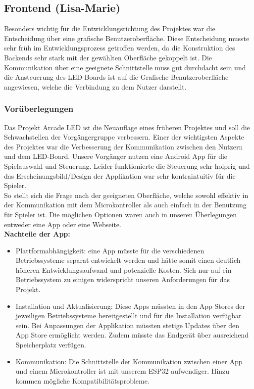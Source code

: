 \documentclass[12pt,a4paper]{article}
\begin{document}
\newpage

\subsection{Frontend  (Lisa-Marie)} 
Besonders wichtig für die Entwicklungsrichtung des Projektes war die Entscheidung über eine grafische Benutzeroberfläche. Diese Entscheidung musste sehr früh im Entwicklungsprozess getroffen werden, da die Konstruktion des Backends sehr stark mit der gewählten Oberfläche gekoppelt ist. Die Kommunikation über eine geeignete Schnittstelle muss gut durchdacht sein und die Ansteuerung des LED-Boards ist auf die Grafische Benutzeroberfläche angewiesen, welche die Verbindung zu dem Nutzer darstellt.  

\subsubsection{Vorüberlegungen}
Das Projekt Arcade LED ist die Neuauflage eines früheren Projektes und soll die Schwachstellen der Vorgängergruppe verbessern. Einer der wichtigsten Aspekte des Projektes war die Verbesserung der Kommunikation zwischen den Nutzern und dem LED-Board. Unsere Vorgänger nutzen eine Android App für die Spielauswahl und Steuerung. Leider funktionierte die Steuerung sehr holprig und das Erscheinungsbild/Design der Applikation war sehr kontraintuitiv für die Spieler. 
\vspace{1.5ex}\\
So stellt sich die Frage nach der geeigneten Oberfläche, welche sowohl effektiv in der Kommunikation mit dem Microkontroller als auch einfach in der Benutzung für Spieler ist. Die möglichen Optionen waren auch in unseren Überlegungen entweder eine App oder eine Webseite.
\vspace{1.5ex}\\
\textbf{Nachteile der App:}\\
\begin{itemize}
\item Plattformabhängigkeit: eine App müsste für die verschiedenen Betriebssysteme separat entwickelt werden und hätte somit einen deutlich höheren Entwicklungsaufwand und potenzielle Kosten. Sich nur auf ein Betriebssystem zu einigen widerspricht unseren Anforderungen für das Projekt. 
\item Installation und Aktualisierung: Diese Apps müssten in den App Stores der jeweiligen Betriebssysteme bereitgestellt und für die Installation verfügbar sein. Bei Anpassungen der Applikation müssten stetige Updates über den App Store ermöglicht werden. Zudem müsste das Endgerät über ausreichend Speicherplatz verfügen. 
\item Kommunikation: Die Schnittstelle der Kommunikation zwischen einer App und einem Microkontroller ist mit unserem ESP32 aufwendiger. Hinzu kommen mögliche Kompatibilitätsprobleme. 
\end{itemize}
\end{document}
